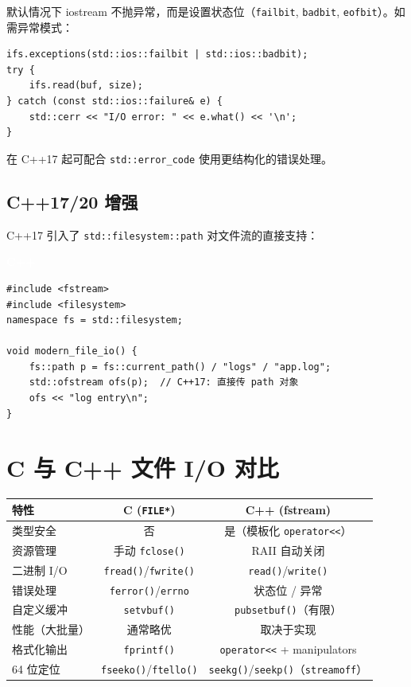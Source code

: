 \documentclass[12pt,a4paper,fontset=fandol]{ctexbook}
\newcommand{\Fn}[1]{\texttt{#1()}}
\newcommand{\Tp}[1]{\texttt{#1}}
\newcommand{\cpplabel}{%
  \noindent\begin{tcolorbox}[sharp corners,colback=algheadbg,colframe=algheadbg,
    left=6pt,right=6pt,top=2pt,bottom=2pt,boxrule=0pt]
  \textcolor{white}{\small\bfseries\sffamily C++}\end{tcolorbox}%
}
\begin{document}
\begin{note}[title=流异常与错误处理]
默认情况下 iostream 不抛异常，而是设置状态位（\Tp{failbit}, \Tp{badbit}, \Tp{eofbit}）。如需异常模式：
\begin{lstlisting}
ifs.exceptions(std::ios::failbit | std::ios::badbit);
try {
    ifs.read(buf, size);
} catch (const std::ios::failure& e) {
    std::cerr << "I/O error: " << e.what() << '\n';
}
\end{lstlisting}
在 C++17 起可配合 \Tp{std::error\_code} 使用更结构化的错误处理。
\end{note}

\subsection{C++17/20 增强}

C++17 引入了 \Tp{std::filesystem::path} 对文件流的直接支持：

\cpplabel
\begin{lstlisting}
#include <fstream>
#include <filesystem>
namespace fs = std::filesystem;

void modern_file_io() {
    fs::path p = fs::current_path() / "logs" / "app.log";
    std::ofstream ofs(p);  // C++17: 直接传 path 对象
    ofs << "log entry\n";
}
\end{lstlisting}

\section{C 与 C++ 文件 I/O 对比}

\begin{compare}[title=C FILE* vs C++ fstream]
\begin{tabular}{lcc}
\toprule
\textbf{特性} & \textbf{C (\Tp{FILE*})} & \textbf{C++ (fstream)} \\
\midrule
类型安全 & 否 & 是（模板化 \Tp{operator<<}） \\
资源管理 & 手动 \Fn{fclose} & RAII 自动关闭 \\
二进制 I/O & \Fn{fread}/\allowbreak{}\Fn{fwrite} & \Fn{read}/\allowbreak{}\Fn{write} \\
错误处理 & \Fn{ferror}/\allowbreak{}\Tp{errno} & 状态位 / 异常 \\
自定义缓冲 & \Fn{setvbuf} & \Fn{pubsetbuf}（有限） \\
性能（大批量） & 通常略优 & 取决于实现 \\
格式化输出 & \Fn{fprintf} & \Tp{operator<<} + manipulators \\
64 位定位 & \Fn{fseeko}/\allowbreak{}\Fn{ftello} & \Fn{seekg}/\allowbreak{}\Fn{seekp}（\Tp{streamoff}） \\
\bottomrule
\end{tabular}
\end{compare}
\end{document}
